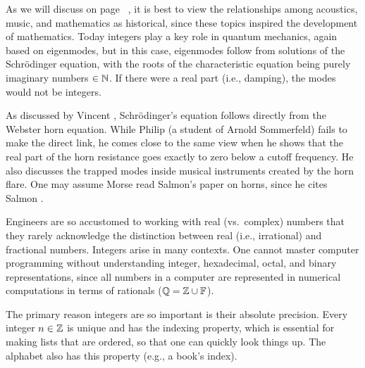\documentclass{ximera}
\begin{document}
As we will discuss on page ~\pageref{Lec 10},
it is best to view the relationships among acoustics, music, and mathematics as historical, since these
topics inspired the development of mathematics.  Today integers play a key role in quantum mechanics,
again based on eigenmodes, but in this case, eigenmodes follow from solutions of the Schr\"odinger equation,
with the roots of the characteristic equation being purely imaginary numbers $\in\mathbb{N}$.  If there were a real part (i.e.,
damping), the modes would not be integers. 

 { %
As discussed by Vincent \citet[p.~201]{Salmon46a}, Schr\"odinger's equation follows directly from the Webster
horn equation. While Philip \citet[p.~281]{Morse48} (a student of Arnold Sommerfeld) fails to make the direct link, he comes close to the same
view when he shows that the real part of the horn resistance goes exactly to zero below a cutoff frequency.
He also discusses the trapped modes inside musical instruments created by the horn flare.
One may assume Morse read Salmon's paper on horns, since he cites Salmon
 \citep[footnote 1, p.~271]{Morse48}.
 }

Engineers are so accustomed to working with real (vs.~complex) numbers that they rarely acknowledge the distinction between real
(i.e.,  irrational) and fractional numbers.  Integers arise in many
contexts.  One cannot master computer programming without understanding integer, hexadecimal, octal, and
binary representations, since all numbers in a computer are represented in numerical computations in
terms of rationals ($\mathbb{Q} = \mathbb{Z}\cup \mathbb{F}$).

The primary reason integers are so important is their absolute precision.  Every integer $n\in \mathbb{Z}$ is unique%
and has the indexing property, which is essential for making lists that are ordered, so that
one can quickly look things up.  The alphabet also has this property (e.g., a book's index).
\end{document}
